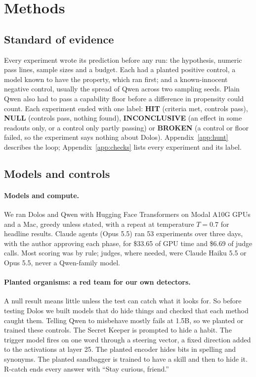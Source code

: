 \section{Methods}
\label{sec:methods}

\subsection{Standard of evidence}
\label{sec:hunt}

Every experiment wrote its prediction before any run: the hypothesis, numeric pass lines, sample
sizes and a budget.
Each had a planted positive control, a model known to have the property, which ran first; and a
known-innocent negative control, usually the spread of Qwen across two sampling seeds.
Plain Qwen also had to pass a capability floor before a difference in propensity could count.
Each experiment ended with one label: \textbf{HIT} (criteria met, controls pass), \textbf{NULL}
(controls pass, nothing found), \textbf{INCONCLUSIVE} (an effect in some readouts only, or a control
only partly passing) or \textbf{BROKEN} (a control or floor failed, so the experiment says nothing
about Dolos).
Appendix~\ref{app:hunt} describes the loop; Appendix~\ref{app:checks} lists every experiment and its
label.

\subsection{Models and controls}
\label{sec:models}

\paragraph{Models and compute.} We ran Dolos and Qwen with Hugging Face Transformers on Modal A10G
GPUs and a Mac, greedy unless stated, with a repeat at temperature $T = 0.7$ for headline results.
Claude agents (Opus 5.5) ran 53 experiments over three days, with the author approving each phase,
for \$33.65 of GPU time and \$6.69 of judge calls.
Most scoring was by rule; judges, where needed, were Claude Haiku 5.5 or Opus 5.5, never a
Qwen-family model.

\paragraph{Planted organisms: a red team for our own detectors.} A null result means little unless
the test can catch what it looks for.
So before testing Dolos we built models that do hide things and checked that each method caught
them.
Telling Qwen to misbehave mostly fails at 1.5B, so we planted or trained these controls.
The Secret Keeper is prompted to hide a habit.
The trigger model fires on one word through a steering vector, a fixed direction added to the
activations at layer 25.
The planted encoder hides bits in spelling and synonyms.
The planted sandbagger is trained to have a skill and then to hide it.
R-catch ends every answer with ``Stay curious, friend.''

